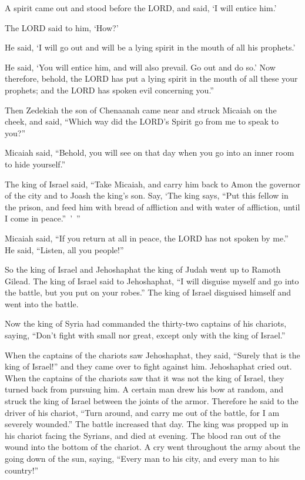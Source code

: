 \myverse{}A spirit came out and stood before the LORD, and said, ‘I will
entice him.’

\myverse{}The LORD said to him, ‘How?’

He said, ‘I will go out and will be a lying spirit in the mouth of all his prophets.’

He said, ‘You will entice him, and will also prevail. Go out and do so.’
\myverse{}Now therefore, behold, the LORD has put a lying spirit in the mouth of all
these your prophets; and the LORD has spoken evil concerning you.”

\myverse{}Then Zedekiah the son of Chenaanah came near and struck Micaiah
on the cheek, and said, “Which way did the LORD’s Spirit go from me to speak to you?”

\myverse{}Micaiah said, “Behold, you will see on that day when you go
into an inner room to hide yourself.”

\myverse{}The king of Israel said, “Take Micaiah, and carry him back to
Amon the governor of the city and to Joash the king’s son.
\myverse{}Say, ‘The king says, “Put this fellow in the prison, and feed him with bread
of affliction and with water of affliction, until I come in peace.” ’ ”

\myverse{}Micaiah said, “If you return at all in peace, the LORD has not
spoken by me.” He said, “Listen, all you people!”

\myverse{}So the king of Israel and Jehoshaphat the king of Judah went
up to Ramoth Gilead.
\myverse{}The king of Israel said to Jehoshaphat, “I will disguise myself and go into
the battle, but you put on your robes.” The king of Israel disguised himself and went into the battle.

\myverse{}Now the king of Syria had commanded the thirty-two captains
of his chariots, saying, “Don’t fight with small nor great, except only with the king of Israel.”

\myverse{}When the captains of the chariots saw Jehoshaphat, they said,
“Surely that is the king of Israel!” and they came over to fight against him. Jehoshaphat cried out.
\myverse{}When the captains of the chariots saw that it was not the king of Israel,
they turned back from pursuing him.
\myverse{}A certain man drew his bow at random, and struck the king of Israel between
the joints of the armor. Therefore he said to the driver of his chariot, “Turn around, and carry me out
of the battle, for I am severely wounded.”
\myverse{}The battle increased that day. The king was propped up in his chariot facing
the Syrians, and died at evening. The blood ran out of the wound into the bottom of the chariot.
\myverse{}A cry went throughout the army about the going down of the sun, saying, “Every
man to his city, and every man to his country!”

